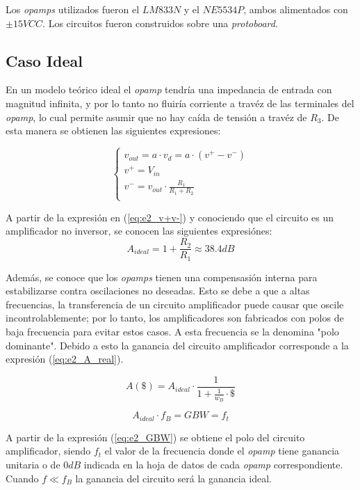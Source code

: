 Los \textit{opamps} utilizados fueron el $LM833N$ y el $NE5534P$, ambos alimentados con $\pm15 VCC$. Los circuitos fueron construidos sobre una \textit{protoboard}.

\subsection{Caso Ideal}
En un modelo teórico ideal el \textit{opamp} tendría una impedancia de entrada con magnitud infinita, y por lo tanto no fluiría corriente a travéz de las terminales del \textit{opamp}, lo cual permite asumir que no hay caída de tensión a travéz de $R_3$. De esta manera se obtienen las siguientes expresiones:

\begin{equation}
\begin{cases}
	v_{out}=a\cdot v_d = a \cdot (v^+ - v^-)\\
	v^+= V_{in}\\
	v^-= v_{out} \cdot \frac{R_1}{R_1 + R_2}\\
\end{cases}
\label{eq:e2_v+v-}
\end{equation}

A partir de la expresión en (\ref{eq:e2_v+v-}) y conociendo que el circuito es un amplificador no inversor, se conocen las siguientes expresiónes:
\begin{equation}
A_{ideal}=1+\frac{R_2}{R_1} \approx 38.4 dB
\label{eq:e2_A_ideal}
\end{equation}

Además, se conoce que los \textit{opamps} tienen una compensasión interna para estabilizarse contra oscilaciones no deseadas. Esto se debe a que a altas frecuencias, la transferencia de un circuito amplificador puede causar que oscile incontrolablemente; por lo tanto, los amplificadores son fabricados con polos de baja frecuencia para evitar estos casos. A esta frecuencia se la denomina "polo dominante". Debido a esto la ganancia del circuito amplificador corresponde a la expresión (\ref{eq:e2_A_real}).

\begin{equation}
A(\$)=A_{ideal} \cdot \frac{1}{1+\frac{1}{w_B}\cdot\$}
\label{eq:e2_A_real}
\end{equation}

\begin{equation}
A_{ideal} \cdot f_B = GBW = f_t
\label{eq:e2_GBW}
\end{equation}

A partir de la expresión (\ref{eq:e2_GBW}) se obtiene el polo del circuito amplificador, siendo $f_t$ el valor de la frecuencia donde el \textit{opamp} tiene ganancia unitaria o de $0 dB$ indicada en la hoja de datos de cada \textit{opamp} correspondiente. Cuando $ f \ll f_B$ la ganancia del circuito será la ganancia ideal.

